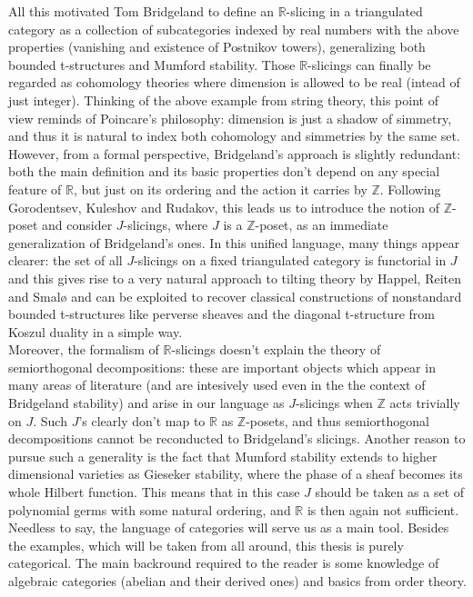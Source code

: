 All this motivated Tom Bridgeland to define an $\mathbb{R}$-slicing in a triangulated category as a collection of subcategories indexed by real numbers with the above properties (vanishing and existence of Postnikov towers), generalizing both bounded t-structures and Mumford stability. Those $\mathbb{R}$-slicings can finally be regarded as cohomology theories where dimension is allowed to be real (intead of just integer). Thinking of the above example from string theory, this point of view reminds of Poincare's philosophy: dimension is just a shadow of simmetry, and thus it is natural to index both cohomology and simmetries by the same set. However, from a formal perspective, Bridgeland's approach is slightly redundant: both the main definition and its basic properties don't depend on any special feature of $\mathbb{R}$, but just on its ordering and the action it carries by $\mathbb{Z}$. Following Gorodentsev, Kuleshov and Rudakov, this leads us to introduce the notion of $\mathbb{Z}$-poset and consider $J$-slicings, where $J$ is a $\mathbb{Z}$-poset, as an immediate generalization of Bridgeland's ones. In this unified language, many things appear clearer: the set of all $J$-slicings on a fixed triangulated category is functorial in $J$ and this gives rise to a very natural approach to tilting theory by Happel, Reiten and Smal\o{} and can be exploited to recover classical constructions of nonstandard bounded t-structures like perverse sheaves and the diagonal t-structure from Koszul duality in a simple way.\\ 

Moreover, the formalism of $\mathbb{R}$-slicings doesn't explain the theory of semiorthogonal decompositions: these are important objects which appear in many areas of literature (and are intesively used even in the the context of Bridgeland stability) and arise in our language as $J$-slicings when $\mathbb{Z}$ acts trivially on $J$. Such $J$'s clearly don't map to $\mathbb{R}$ as $\mathbb{Z}$-posets, and thus semiorthogonal decompositions cannot be reconducted to Bridgeland's slicings. Another reason to pursue such a generality is the fact that Mumford stability extends to higher dimensional varieties as Gieseker stability, where the phase of a sheaf becomes its whole Hilbert function. This means that in this case $J$ should be taken as a set of polynomial germs with some natural ordering, and $\mathbb{R}$ is then again not sufficient. \\

Needless to say, the language of categories will serve us as a main tool. Besides the examples, which will be taken from all around, this thesis is purely categorical. The main backround required to the reader is some knowledge of algebraic categories (abelian and their derived ones) and basics from order theory. \\ \\

